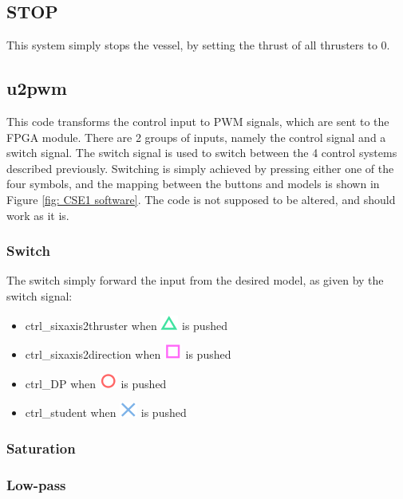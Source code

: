 \subsection{STOP}
This system simply stops the vessel, by setting the thrust of all thrusters to 0. 
\subsection{u2pwm}
This code transforms the control input to PWM signals, which are sent to the FPGA module. There are 2 groups of inputs, namely the control signal and a switch signal. The switch signal is used to switch between the 4 control systems described previously. Switching is simply achieved by pressing either one of the four symbols, and the mapping between the buttons and models is shown in Figure \ref{fig: CSE1 software}. The code is not supposed to be altered, and should work as it is. 

\subsubsection{Switch}
The switch simply forward the input from the desired model, as given by the switch signal:
\begin{itemize}
	\item ctrl\_sixaxis2thruster when \includegraphics[scale=0.4]{fig/sixaxis_triangle} is pushed
	\item ctrl\_sixaxis2direction when \includegraphics[scale=0.4]{fig/sixaxis_square} is pushed
	\item ctrl\_DP when \includegraphics[scale=0.4]{fig/sixaxis_circle} is pushed
	\item ctrl\_student when \includegraphics[scale=0.4]{fig/sixaxis_cross} is pushed
\end{itemize}
\subsubsection{Saturation}

\subsubsection{Low-pass}
